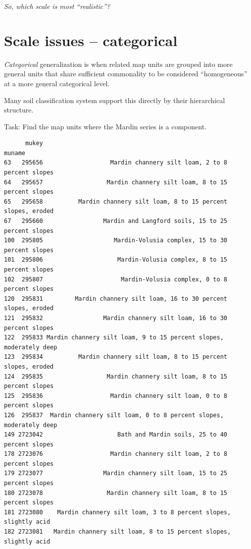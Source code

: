 \documentclass[
  letterpaper,
  DIV=11,
  numbers=noendperiod]{scrartcl}
\begin{document}
\emph{So, which scale is most ``realistic''?}

\hypertarget{sec-categorical-generalization}{%
\section{Scale issues --
categorical}\label{sec-categorical-generalization}}

\emph{Categorical} generalization is when related map units are grouped
into more general units that share sufficient commonality to be
considered ``homogeneous'' at a more general categorical level.

Many soil classification system support this directly by their
hierarchical structure.

Task: Find the map units where the Mardin series is a component.

\begin{verbatim}
      mukey                                                             muname
63   295656                   Mardin channery silt loam, 2 to 8 percent slopes
64   295657                  Mardin channery silt loam, 8 to 15 percent slopes
65   295658          Mardin channery silt loam, 8 to 15 percent slopes, eroded
67   295660                 Mardin and Langford soils, 15 to 25 percent slopes
100  295805                    Mardin-Volusia complex, 15 to 30 percent slopes
101  295806                     Mardin-Volusia complex, 8 to 15 percent slopes
102  295807                      Mardin-Volusia complex, 0 to 8 percent slopes
120  295831         Mardin channery silt loam, 16 to 30 percent slopes, eroded
121  295832                 Mardin channery silt loam, 16 to 30 percent slopes
122  295833 Mardin channery silt loam, 9 to 15 percent slopes, moderately deep
123  295834          Mardin channery silt loam, 8 to 15 percent slopes, eroded
124  295835                  Mardin channery silt loam, 8 to 15 percent slopes
125  295836                   Mardin channery silt loam, 0 to 8 percent slopes
126  295837  Mardin channery silt loam, 0 to 8 percent slopes, moderately deep
149 2723042                     Bath and Mardin soils, 25 to 40 percent slopes
178 2723076                   Mardin channery silt loam, 2 to 8 percent slopes
179 2723077                 Mardin channery silt loam, 15 to 25 percent slopes
180 2723078                  Mardin channery silt loam, 8 to 15 percent slopes
181 2723080    Mardin channery silt loam, 3 to 8 percent slopes, slightly acid
182 2723081   Mardin channery silt loam, 8 to 15 percent slopes, slightly acid
\end{verbatim}
\end{document}
